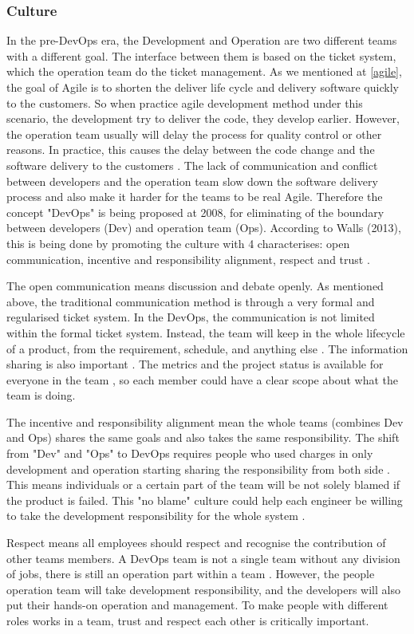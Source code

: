 \subsubsection[]{Culture}
In the pre-DevOps era, the Development and Operation are two different teams with a different goal. The interface between them is based on the ticket system, which the operation team do the ticket management. As we mentioned at \ref{agile}, the goal of Agile is to shorten the deliver life cycle and delivery software quickly to the customers. So when practice agile development method under this scenario, the development try to deliver the code, they develop earlier. However, the operation team usually will delay the process for quality control or other reasons. In practice, this causes the delay between the code change and the software delivery to the customers \cite{leite2019survey}. 
The lack of communication and conflict between developers and the operation team slow down the software delivery process and also make it harder for the teams to be real Agile. Therefore the concept "DevOps" is being proposed at 2008, for eliminating of the boundary between developers (Dev) and operation team (Ops). According to Walls (2013), this is being done by promoting the culture with 4 characterises: open communication, incentive and responsibility alignment, respect and trust \cite{walls2013building}.
\par 
The open communication means discussion and debate openly. As mentioned above, the traditional communication method is through a very formal and regularised ticket system. In the DevOps, the communication is not limited within the formal ticket system. Instead, the team will keep in the whole lifecycle of a product, from the requirement, schedule, and anything else \cite{walls2013building}. The information sharing is also important \cite{lwakatare2015dimensions}. The metrics and the project status is available for everyone in the team \label{moniter}, so each member could have a clear scope about what the team is doing.
\par
The incentive and responsibility alignment mean the whole teams (combines Dev and Ops) shares the same goals and also takes the same responsibility. The shift from "Dev" and "Ops" to DevOps requires people who used charges in only development and operation starting sharing the responsibility from both side \cite{lwakatare2015dimensions}. This means individuals or a certain part of the team will be not solely blamed if the product is failed. This "no blame" culture could help each engineer be willing to take the development responsibility for the whole system \cite{feitelson2013development}.
\par 
Respect means all employees should respect and recognise the contribution of other teams members. A DevOps team is not a single team without any division of jobs, there is still an operation part within a team \cite{TheresNo86:online}. However, the people operation team will take development responsibility, and the developers will also put their hands-on operation and management\cite{shropshire2017uncertainty}. To make people with different roles works in a team, trust and respect each other is critically important. 
